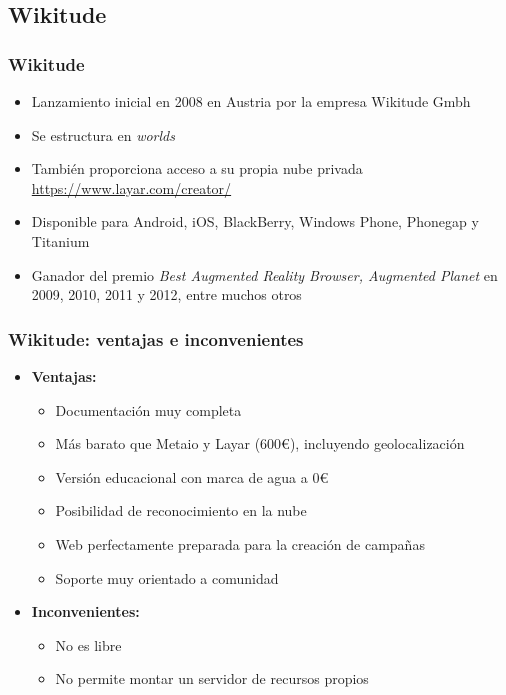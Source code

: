 \subsection*{Wikitude}
\frame
{
\frametitle{Wikitude}
\begin{itemize}
 \item Lanzamiento inicial en 2008 en Austria por la empresa Wikitude Gmbh
 \item Se estructura en \textit{worlds}
 \item También proporciona acceso a su propia nube privada\\
   \url{https://www.layar.com/creator/}
 \item Disponible para Android, iOS, BlackBerry, Windows Phone, Phonegap y Titanium
 \item Ganador del premio \textit{Best Augmented Reality Browser, Augmented Planet} en 2009, 2010, 2011 y 2012, entre muchos otros
\end{itemize}
}

\frame
{
\frametitle{Wikitude: ventajas e inconvenientes}
\begin{itemize}
\item \textbf{Ventajas:}
  \begin{itemize}
   \item Documentación muy completa
   \item Más barato que Metaio y Layar (600\euro), incluyendo geolocalización
   \item Versión educacional con marca de agua a 0\euro
   \item Posibilidad de reconocimiento en la nube
   \item Web perfectamente preparada para la creación de campañas
   \item Soporte muy orientado a comunidad
  \end{itemize}

\item \textbf{Inconvenientes:}
  \begin{itemize}
   \item No es libre
   \item No permite montar un servidor de recursos propios
  \end{itemize}

\end{itemize}
}
